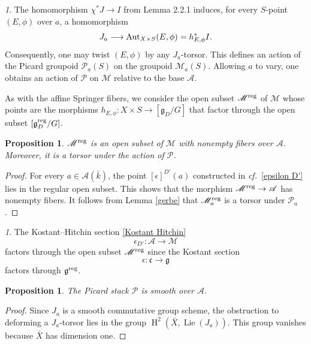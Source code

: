 \documentclass[12pt,english]{smfart}
\numberwithin{equation}{subsection}
\newtheorem{proposition}[equation]{Proposition}
\theoremstyle{remark}
\newtheorem{numero}[equation]{}
\newcommand\calA{{\mathscr A}}
\newcommand\calP{{\mathscr P}}
\newcommand\calM{{\mathscr M}}
\newcommand\frakg{{\mathfrak g}}
\newcommand\frakc{{\mathfrak c}}
\newcommand\Aut{{\rm Aut}}
\newcommand\cf{{\it cf.\ }}
\newcommand\reg{{\rm reg}}
\begin{document}
\begin{numero}
The homomorphism $\chi^*J \longrightarrow I$ from Lemma 2.2.1 induces, for every $S$-point $(E,\phi)$ over $a$, a homomorphism
$$J_a \longrightarrow \Aut_{X\times S}(E,\phi) = h_{E,\phi}^* I.$$
Consequently, one may twist $(E,\phi)$ by any $J_a$-torsor. This defines an action of the Picard groupoid $\calP_a(S)$ on the groupoid $\calM_a(S)$. Allowing $a$ to vary, one obtains an action of $\calP$ on $\calM$ relative to the base $\calA$.
\end{numero}

As with the affine Springer fibers, we consider the open subset $\calM^\reg$ of $\calM$ whose points are the morphisms $h_{E,\phi}: X \times S \longrightarrow [\frakg_{D}/G]$ that factor through the open subset $[\frakg^\reg_{D}/G]$.

\begin{proposition}\label{M reg}
$\calM^\reg$ is an open subset of $\calM$ with nonempty fibers over $\calA$. Moreover, it is a torsor under the action of $\calP$.
\end{proposition}

\begin{proof}
For every $a \in \calA(\bar{k})$, the point $[\epsilon]^{D'}(a)$ constructed in \cf\ref{epsilon D'} lies in the regular open subset. This shows that the morphism $\calM^\reg \rightarrow \calA$ has nonempty fibers. It follows from Lemma \ref{gerbe} that $\calM_a^\reg$ is a torsor under $\calP_a$.
\end{proof}

\begin{numero}
The Kostant--Hitchin section \ref{Kostant Hitchin} 
$$\epsilon_{D'}: \calA \longrightarrow \calM$$ 
factors through the open subset $\calM^\reg$ since the Kostant section 
$$\epsilon: \frakc \longrightarrow \frakg$$ 
factors through $\frakg^\reg$.
\end{numero}

\begin{proposition}\label{P lisse}
The Picard stack $\mathcal{P}$ is smooth over $\mathcal{A}$.
\end{proposition}

\begin{proof}
Since $J_a$ is a smooth commutative group scheme, the obstruction to deforming a $J_a$-torsor
lies in the group $\operatorname{H}^2(\bar{X},\operatorname{Lie}(J_a))$. This group vanishes because $\bar{X}$
has dimension one.
\end{proof}
\end{document}
